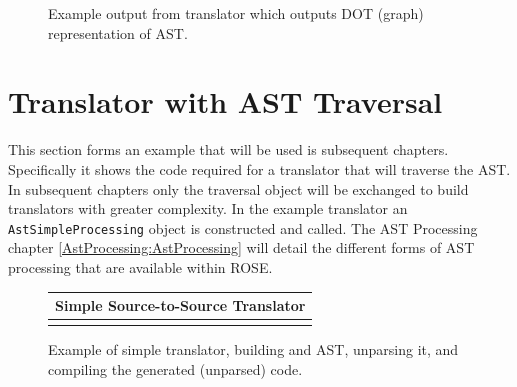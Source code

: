 \begin{figure}
\centerline{}
\caption{Example output from translator which outputs DOT (graph) representation of AST.}
\label{translatorDesign:dotOutput1.ps}
\end{figure}

\section{Translator with AST Traversal}

   This section forms an example that will be used is subsequent chapters.
Specifically it shows the code required for a translator that will
traverse the AST.  In subsequent chapters only the traversal object will be
exchanged to build translators with greater complexity.
In the example translator \label{translatorDesign:AstTraversalTranslator}
an {\tt AstSimpleProcessing} object is constructed and called. The AST Processing
chapter \ref{AstProcessing:AstProcessing} will detail the different forms of
AST processing that are available within ROSE.

{\indent
{\mySmallFontSize

\begin{latexonly}
\begin{figure}[tb]
\begin{center}
\begin{tabular}{|c|} \hline
     Simple Source-to-Source Translator
\\\hline\hline

\\\hline
\end{tabular}
\end{center}
\caption{ Example of simple translator, building and AST, unparsing it, and compiling
    the generated (unparsed) code. }
\end{figure}
\end{latexonly}

\begin{htmlonly}
   
\end{htmlonly}

\label{translatorDesign:AstTraversalTranslator}

}
}

